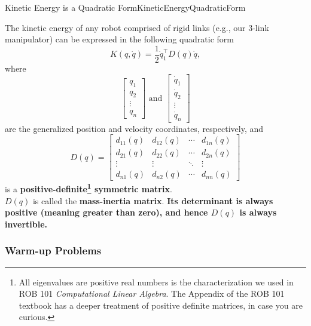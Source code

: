 \begin{propColor}{Kinetic Energy is a Quadratic Form}{KineticEnergyQuadraticForm}

The kinetic energy of any robot comprised of rigid links (e.g., our 3-link manipulator) can be expressed in the following quadratic form 
\begin{equation}
    \label{eq:KEwithMassInertiaMatrix}
    K(q, \dot{q}) = \frac{1}{2} \dot{q}_1^\top D(q) \dot{q},
\end{equation}
where $$ \left[ \begin{array}{c} q_1 \\  q_2 \\ \vdots \\ q_n \end{array} \right] \text{ and } \left[ \begin{array}{c} \dot{q}_1 \\  \dot{q}_2 \\ \vdots \\ \dot{q}_n \end{array} \right]$$
are the generalized position and velocity coordinates, respectively, and 
\begin{equation}
    \label{eq:MassInertiaMatrix}
    D(q) = \left[ \begin{array}{cccc} 
    d_{11}(q) &  d_{12}(q) & \cdots &  d_{1n}(q) \\  
    d_{21}(q) &  d_{22}(q) & \cdots &  d_{2n}(q) \\ 
    \vdots & \vdots & \ddots & \vdots \\
    d_{n1}(q) &  d_{n2}(q) & \cdots &  d_{nn}(q)     
    \end{array} \right] 
\end{equation}
is a \textbf{positive-definite\footnote{All eigenvalues are positive real numbers is the characterization we used in ROB 101 \textit{Computational Linear Algebra}. The Appendix of the ROB 101 textbook has a deeper treatment of positive definite matrices, in case you are curious.} symmetric matrix}. \\

$D(q)$ is called the \textbf{mass-inertia matrix}. \textbf{Its determinant is always positive (meaning greater than zero), and hence $D(q)$ is always invertible.}   
\end{propColor}

\subsubsection{Warm-up Problems}


